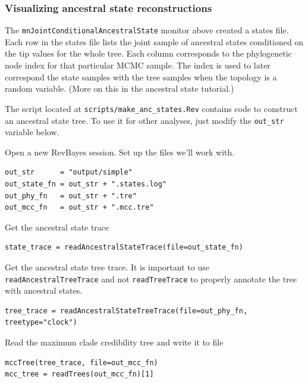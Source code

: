 \subsubsection{Visualizing ancestral state reconstructions}

The {\tt mnJointConditionalAncestralState} monitor above created a states file.
Each row in the states file lists the joint sample of ancestral states conditioned on the tip values for the whole tree.
Each column corresponds to the phylogenetic node index for that particular MCMC sample.
The index is used to later correspond the state samples with the tree samples when the topology is a random variable.
(More on this in the ancestral state tutorial.)

The script located at {\tt scripts/make\_anc\_states.Rev} contains code to construct an ancestral state tree.
To use it for other analyses, just modify the {\tt out\_str} variable below.

Open a new RevBayes session. Set up the files we'll work with.
\begin{snugshade}
\begin{lstlisting}
out_str      = "output/simple"
out_state_fn = out_str + ".states.log"
out_phy_fn   = out_str + ".tre"
out_mcc_fn   = out_str + ".mcc.tre" 
\end{lstlisting}
\end{snugshade}


Get the ancestral state trace

\begin{snugshade}
\begin{lstlisting}
state_trace = readAncestralStateTrace(file=out_state_fn)
\end{lstlisting}
\end{snugshade}


Get the ancestral state tree trace. It is important to use {\tt readAncestralTreeTrace} and not {\tt readTreeTrace} to properly annotate the tree with ancestral states.

\begin{snugshade}
\begin{lstlisting}
tree_trace = readAncestralStateTreeTrace(file=out_phy_fn, treetype="clock")
\end{lstlisting}
\end{snugshade}

Read the maximum clade credibility tree and write it to file

\begin{snugshade}
\begin{lstlisting}
mccTree(tree_trace, file=out_mcc_fn)
mcc_tree = readTrees(out_mcc_fn)[1]
\end{lstlisting}
\end{snugshade}

